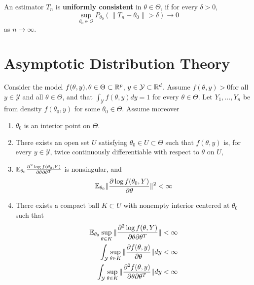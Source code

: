 \begin{defn}
  \label{sec:cons-model-ftheta}
  An estimator $T_{n}$ is \textbf{uniformly consistent} in $\theta \in
  \Theta$, if for every $\delta > 0$,
  \begin{equation}
    \label{eq:25}
    \sup_{\theta_{0} \in \Theta} P_{\theta_{0}}(\| T_{n} - \theta_{0}
    \| > \delta) \rightarrow 0
  \end{equation} as $n \rightarrow \infty$.
\end{defn}

\section{Asymptotic Distribution Theory}
\label{sec:asympt-distr-theory}

\begin{thm}
  Consider the model $f(\theta, y), \theta \in \Theta \subset \mathbb{R}^{p}$,
  $y \in \mathcal{Y} \subset \mathbb{R}^{d}$.  Assume $f(\theta, y) > 0$for
  all $y \in \mathcal{Y}$ and all $\theta \in \Theta$, and that
  $\int_{\mathcal{Y}} f(\theta, y) dy = 1$  for every $\theta \in
  \Theta$. Let $Y_{1}, \dots, Y_{n}$ be \iid from density
  $f(\theta_{0}, y)$ for some $\theta_{0} \in \Theta$.  Assume moreover
  \begin{enumerate}
  \item $\theta_{0}$ is an interior point on $\Theta$.
  \item There exists an open set $U$ satisfying $\theta_{0} \in U
    \subset \Theta$ such that $f(\theta, y)$ is, for every $y \in
    \mathcal{Y}$, twice continuously differentiable with respect to
    $\theta$ on $U$,
  \item $\E_{\theta_{0}} \frac{\partial^{2} \log f(\theta_{0},
      Y)}{\partial \theta \partial \theta^{T}} $ is nonsingular, and
    \begin{equation}
      \label{eq:3}
      \E_{\theta_{0}} \| \frac{\partial \log f(\theta_{0},
        Y)}{\partial \theta} \|^{2}  < \infty
    \end{equation}
  \item There exists a compact ball $K \subset U$ with nonempty
    interior centered at $\theta_{0}$ such that
    \begin{align}
      \label{eq:7}
      \E_{\theta_{0}} \sup_{\theta \in K} \| \frac{\partial^{2} \log
        f(\theta, Y)}{\partial \theta \partial \theta^{T}} \| < \infty \\
      \int_{\mathcal{Y}}^{} \sup_{\theta \in K} \| \frac{\partial
        f(\theta, y)}{\partial \theta}  \| dy < \infty \\
      \label{eq:14}
      \int_{\mathcal{Y}}^{} \sup_{\theta \in K} \| \frac{\partial^{2}
        f(\theta, y)}{\partial \theta \partial \theta^{T}}  \| dy < \infty
    \end{align}
  \end{enumerate}


\end{thm}
